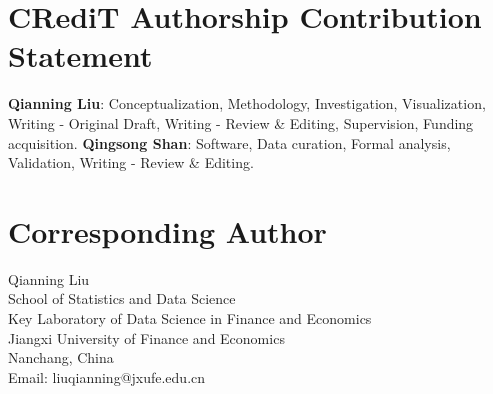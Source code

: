 \documentclass[
  number,
  preprint]{elsarticle}
\begin{document}
\section*{CRediT Authorship Contribution
Statement}\label{credit-authorship-contribution-statement}

\textbf{Qianning Liu}: Conceptualization, Methodology, Investigation,
Visualization, Writing - Original Draft, Writing - Review \& Editing,
Supervision, Funding acquisition. \textbf{Qingsong Shan}: Software, Data
curation, Formal analysis, Validation, Writing - Review \& Editing.

\section*{Corresponding Author}\label{corresponding-author}

Qianning Liu\\
School of Statistics and Data Science\\
Key Laboratory of Data Science in Finance and Economics\\
Jiangxi University of Finance and Economics\\
Nanchang, China\\
Email: liuqianning@jxufe.edu.cn



\end{document}
